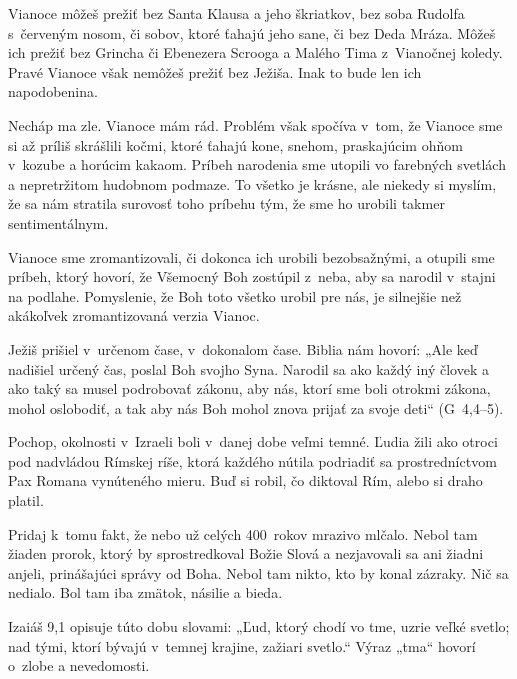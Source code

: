 \def\velkostpisma{10}
\def\velkostriadku{12.5}




Vianoce môžeš prežiť bez Santa Klausa a jeho škriatkov, bez soba Rudolfa s~červeným nosom, či sobov, ktoré ťahajú jeho sane, či bez Deda Mráza. Môžeš ich prežiť bez Grincha či Ebenezera Scrooga a Malého Tima z~Vianočnej koledy. Pravé Vianoce však nemôžeš prežiť bez Ježiša. Inak to bude len ich napodobenina.

Necháp ma zle. Vianoce mám rád. Problém však spočíva v~tom, že Vianoce sme si až príliš skrášlili kočmi, ktoré ťahajú kone, snehom, praskajúcim ohňom v~kozube a horúcim kakaom. Príbeh narodenia sme utopili vo farebných svetlách a nepretržitom hudobnom podmaze. To všetko je krásne, ale niekedy si myslím, že sa nám stratila surovosť toho príbehu tým, že sme ho urobili takmer sentimentálnym.

Vianoce sme zromantizovali, či dokonca ich urobili bezobsažnými, a otupili sme príbeh, ktorý hovorí, že Všemocný Boh zostúpil z~neba, aby sa narodil v~stajni na podlahe. Pomyslenie, že Boh toto všetko urobil pre nás, je silnejšie než akákoľvek zromantizovaná verzia Vianoc.

Ježiš prišiel v~určenom čase, v~dokonalom čase. Biblia nám hovorí: „Ale keď nadišiel určený čas, poslal Boh svojho Syna. Narodil sa ako každý iný človek a ako taký sa musel podrobovať zákonu, aby nás, ktorí sme boli otrokmi zákona, mohol oslobodiť, a tak aby nás Boh mohol znova prijať za svoje deti“ (G~4,4–5).

Pochop, okolnosti v~Izraeli boli v~danej dobe veľmi temné. Ľudia žili ako otroci pod nadvládou Rímskej ríše, ktorá každého nútila podriadiť sa prostredníctvom Pax Romana vynúteného mieru. Buď si robil, čo diktoval Rím, alebo si draho platil.

Pridaj k~tomu fakt, že nebo už celých 400~rokov mrazivo mlčalo. Nebol tam žiaden prorok, ktorý by sprostredkoval Božie Slová a nezjavovali sa ani žiadni anjeli, prinášajúci správy od Boha. Nebol tam nikto, kto by konal zázraky. Nič sa nedialo. Bol tam iba zmätok, násilie a bieda.

Izaiáš 9,1 opisuje túto dobu slovami: „Ľud, ktorý chodí vo tme, uzrie veľké svetlo; nad tými, ktorí bývajú v~temnej krajine, zažiari svetlo.“ Výraz „tma“ hovorí o~zlobe a nevedomosti.

